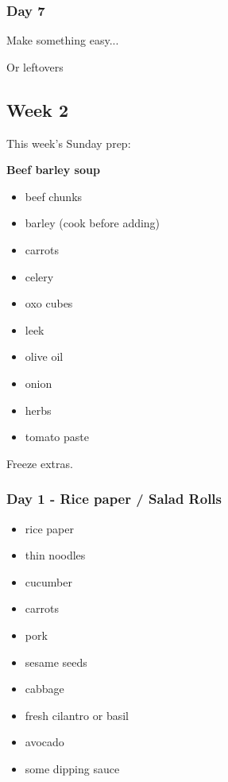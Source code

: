 \documentclass[11pt, a4paper]{article}
\begin{document}
\subsubsection{Day 7}
\vspace{1pc}
\noindent Make something easy...
\par
Or leftovers


\vspace{0.917 pc} %

\pagebreak
\subsection{Week 2}

This week's Sunday prep:
\par
\vspace{1pc}
\noindent\textbf{Beef barley soup}
\par
\begin{itemize}
\item beef chunks
\item barley (cook before adding)
\item carrots
\item celery
\item oxo cubes
\item leek
\item olive oil
\item onion
\item herbs
\item tomato paste
\end{itemize}
Freeze extras.

\subsubsection{Day 1 - Rice paper / Salad Rolls}
\vspace{1pc}
\begin{itemize}
\item rice paper
\item thin noodles
\item cucumber
\item carrots
\item pork
\item sesame seeds
\item cabbage
\item fresh cilantro or basil
\item avocado
\item some dipping sauce
\end{itemize}
\end{document}
